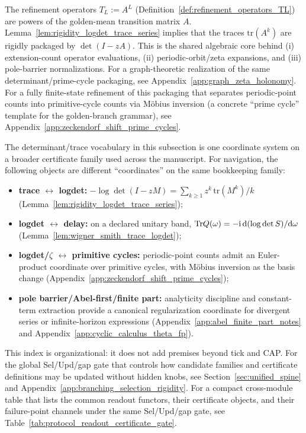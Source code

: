 \begin{remark}\label{rem:rigidity_refinement_to_det_trace}
\AuditTag The refinement operators $T_L:=A^L$ (Definition~\ref{def:refinement_operators_TL}) are powers of the golden-mean transition matrix $A$.
Lemma~\ref{lem:rigidity_logdet_trace_series} implies that the traces $\mathrm{tr}(A^k)$ are rigidly packaged by $\det(I-zA)$.
This is the shared algebraic core behind (i) extension-count operator evaluations, (ii) periodic-orbit/zeta expansions, and (iii) pole-barrier normalizations.
For a graph-theoretic realization of the same determinant/prime-cycle packaging, see Appendix~\ref{app:graph_zeta_holonomy}.
\AuditTag For a fully finite-state refinement of this packaging that separates periodic-point counts into primitive-cycle counts via M\"obius inversion (a concrete ``prime cycle'' template for the golden-branch grammar), see Appendix~\ref{app:zeckendorf_shift_prime_cycles}.
\end{remark}

\begin{remark}\label{rem:certificate_calculus_index}
\AuditTag The determinant/trace vocabulary in this subsection is one coordinate system on a broader certificate family used across the manuscript.
For navigation, the following objects are different ``coordinates'' on the same bookkeeping family:
\begin{itemize}
\item \textbf{trace $\leftrightarrow$ logdet:} $-\log\det(I-zM)=\sum_{k\ge 1} z^k\,\mathrm{tr}(M^k)/k$ (Lemma~\ref{lem:rigidity_logdet_trace_series});
\item \textbf{logdet $\leftrightarrow$ delay:} on a declared unitary band, $\mathrm{Tr} Q(\omega)=-\mathrm{i}\,\mathrm{d}(\log\det S)/\mathrm{d}\omega$ (Lemma~\ref{lem:wigner_smith_trace_logdet});
\item \textbf{logdet/\texorpdfstring{$\zeta$}{zeta} $\leftrightarrow$ primitive cycles:} periodic-point counts admit an Euler-product coordinate over primitive cycles, with M\"obius inversion as the basis change (Appendix~\ref{app:zeckendorf_shift_prime_cycles});
\item \textbf{pole barrier/Abel-first/finite part:} analyticity discipline and constant-term extraction provide a canonical regularization coordinate for divergent series or infinite-horizon expressions (Appendix~\ref{app:abel_finite_part_notes} and Appendix~\ref{app:cyclic_calculus_theta_fp}).
\end{itemize}
\AuditTag This index is organizational: it does not add premises beyond tick and CAP.
For the global Sel/Upd/gap gate that controls how candidate families and certificate definitions may be updated without hidden knobs, see Section~\ref{sec:unified_spine} and Appendix~\ref{app:branching_selection_rigidity}.
\AuditTag For a compact cross-module table that lists the common readout functors, their certificate objects, and their failure-point channels under the same Sel/Upd/gap gate, see Table~\ref{tab:protocol_readout_certificate_gate}.
\end{remark}

